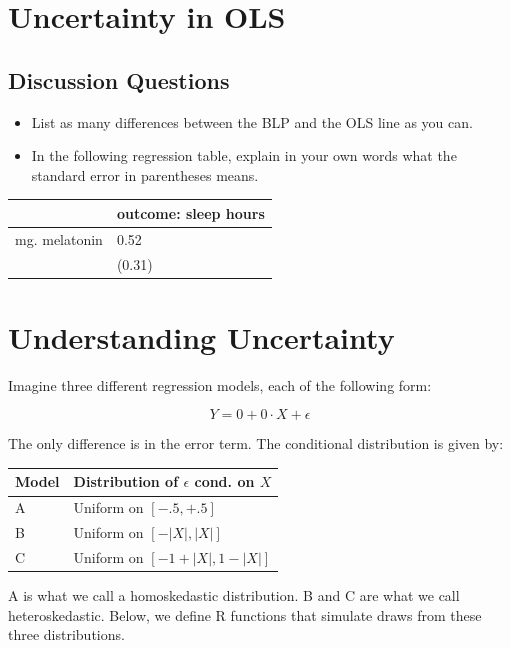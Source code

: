 \documentclass[
]{book}
\providecommand{\tightlist}{%
  \setlength{\itemsep}{0pt}\setlength{\parskip}{0pt}}
\theoremstyle{definition}
\theoremstyle{definition}
\theoremstyle{definition}
\theoremstyle{definition}
\theoremstyle{remark}
\begin{document}
\hypertarget{uncertainty-in-ols}{%
\section{Uncertainty in OLS}\label{uncertainty-in-ols}}

\hypertarget{discussion-questions-1}{%
\subsection{Discussion Questions}\label{discussion-questions-1}}

\begin{itemize}
\tightlist
\item
  List as many differences between the BLP and the OLS line as you can.
\item
  In the following regression table, explain in your own words what the standard error in parentheses means.
\end{itemize}

\begin{longtable}[]{@{}ll@{}}
\toprule
& outcome: sleep hours \\
\midrule
\endhead
mg. melatonin & 0.52 \\
& (0.31) \\
\bottomrule
\end{longtable}

\hypertarget{understanding-uncertainty}{%
\section{Understanding Uncertainty}\label{understanding-uncertainty}}

Imagine three different regression models, each of the following form:

\[
  Y = 0 + 0 \cdot X + \epsilon
\]

The only difference is in the error term. The conditional distribution is given by:

\begin{longtable}[]{@{}ll@{}}
\toprule
Model & Distribution of \(\epsilon\) cond. on \(X\) \\
\midrule
\endhead
A & Uniform on \([-.5, +.5]\) \\
B & Uniform on \([ - |X|, |X| ]\) \\
C & Uniform on \([ -1 + |X|, 1- |X| ]\) \\
\bottomrule
\end{longtable}

A is what we call a homoskedastic distribution. B and C are what we call heteroskedastic. Below, we define R functions that simulate draws from these three distributions.
\end{document}
